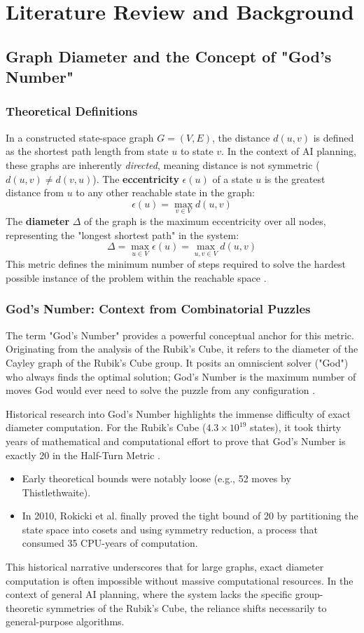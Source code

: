 \chapter{Literature Review and Background}

\section{Graph Diameter and the Concept of "God's Number"}

\subsection{Theoretical Definitions}
In a constructed state-space graph $G = (V, E)$, the distance $d(u, v)$ is defined as the shortest path length from state $u$ to state $v$. In the context of AI planning, these graphs are inherently \textit{directed}, meaning distance is not symmetric ($d(u, v) \neq d(v, u)$). The \textbf{eccentricity} $\epsilon(u)$ of a state $u$ is the greatest distance from $u$ to any other reachable state in the graph:
\[
\epsilon(u) = \max_{v \in V} d(u, v)
\]
The \textbf{diameter} $\Delta$ of the graph is the maximum eccentricity over all nodes, representing the "longest shortest path" in the system:
\[
\Delta = \max_{u \in V} \epsilon(u) = \max_{u, v \in V} d(u, v)
\]
This metric defines the minimum number of steps required to solve the hardest possible instance of the problem within the reachable space \cite{westGraphTheory}.

\subsection{God's Number: Context from Combinatorial Puzzles}
The term "God's Number" provides a powerful conceptual anchor for this metric. Originating from the analysis of the Rubik's Cube, it refers to the diameter of the Cayley graph of the Rubik's Cube group. It posits an omniscient solver ("God") who always finds the optimal solution; God's Number is the maximum number of moves God would ever need to solve the puzzle from any configuration \cite{mathworld}.

Historical research into God's Number highlights the immense difficulty of exact diameter computation. For the Rubik's Cube ($4.3 \times 10^{19}$ states), it took thirty years of mathematical and computational effort to prove that God's Number is exactly 20 in the Half-Turn Metric \cite{siam}.
\begin{itemize}
    \item Early theoretical bounds were notably loose (e.g., 52 moves by Thistlethwaite).
    \item In 2010, Rokicki et al. finally proved the tight bound of 20 by partitioning the state space into cosets and using symmetry reduction, a process that consumed 35 CPU-years of computation.
\end{itemize}
This historical narrative underscores that for large graphs, exact diameter computation is often impossible without massive computational resources. In the context of general AI planning, where the system lacks the specific group-theoretic symmetries of the Rubik's Cube, the reliance shifts necessarily to general-purpose algorithms.

